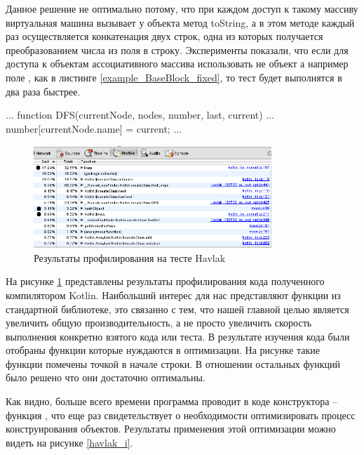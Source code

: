 Данное решение не оптимально потому, что при каждом доступ к такому массиву виртуальная машина вызывает у объекта метод toString, а в этом методе каждый раз осуществляется конкатенация двух строк, одна из которых получается преобразованием числа из поля  в строку. Эксперименты показали, что если для доступа к объектам ассоциативного массива использовать не объект а например поле , как в листинге \ref{example_BaseBlock_fixed}, то тест будет выполнятся в два раза быстрее.

\begin{code}
\begin{JavaScript}[caption=Пример улучшения использования ассоциативного массива в тесте на JavaScript, label=example_BaseBlock_fixed]
...
function DFS(currentNode, nodes, number, last, current) {
...
  number[currentNode.name] = current;
...
}
\end{JavaScript}
\end{code}

\begin{figure}[ht!]
\centering
\includegraphics[width=0.8\textwidth]{img/havlak_0_profile.png}
\caption{Результаты профилирования на тесте Havlak}
\label{havlak_0_profile}
\end{figure}


На рисунке \ref{havlak_0_profile} представлены результаты профилирования кода полученного компилятором Kotlin. Наибольший интерес для нас представляют функции из стандартной библиотеке, это связанно с тем, что нашей главной целью является увеличить общую производительность, а не просто увеличить скорость выполнения конкретно взятого кода или теста. В результате изучения кода были отобраны функции которые нуждаются в оптимизации. На рисунке такие функции помечены точкой в начале строки. В отношении остальных функций было решено что они достаточно оптимальны.

Как видно, больше всего времени программа проводит в коде конструктора -- функция , что еще раз свидетельствует о необходимости оптимизировать процесс конструирования объектов. Результаты применения этой оптимизации можно видеть на рисунке \ref{havlak_i}.

